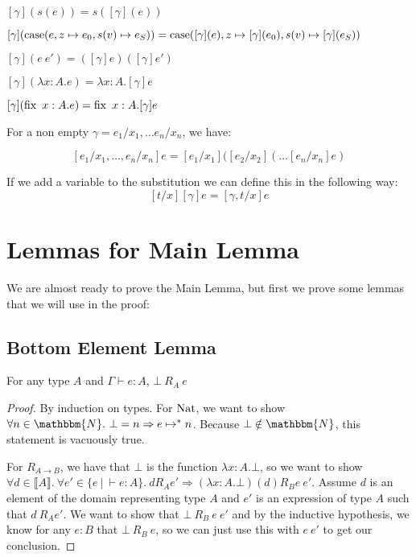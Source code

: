 \vspace{0.5cm}

\begin{adjustwidth}{2cm}{}

$[\gamma](s(e)) = s([\gamma] (e))$

$[\gamma](\operatorname{case} (e, z \mapsto e_0, s(v) \mapsto e_S)) = \operatorname{case} ([\gamma](e), z \mapsto [\gamma](e_0), s(v) \mapsto [\gamma](e_S))$

$[\gamma](e \ e') = ([\gamma] e) ([\gamma] e')$

$[\gamma] (\lambda x:A. e) = \lambda x:A. [\gamma] e$

$[\gamma] (\operatorname{fix} \ x:A. e) = \operatorname{fix} \ x:A. [\gamma] e$
\end{adjustwidth}

\vspace{0.5cm}

For a non empty $\gamma = e_1/x_1, \dots e_n/x_n$, we have:

\[ [e_1/x_1, \dots , e_n/x_n] e = [e_1/x_1]([e_2/x_2]( \dots [e_n/x_n] e) \]

If we add a variable to the substitution we can define this in the following way:
\[ [t/x][\gamma] e = [\gamma, t/x] e \]

\section{Lemmas for Main Lemma}
We are almost ready to prove the Main Lemma, but first we prove some lemmas that we will use in the proof:


\subsection{Bottom Element Lemma}

\vspace{0.25cm}

\begin{lem} \label{bot}
For any type $A$ and $\Gamma \vdash e: A$, $\bot \ R_A \ e$ 
\end{lem}

\begin{proof}
By induction on types. For $\operatorname{Nat}$, we want to show $\forall n \in \mathbbm{N}. \ \bot  = n \Rightarrow e \mapsto^* n$. Because $\bot \notin \mathbbm{N}$, this statement is vacuously true.

For $R_{A \to B}$, we have that $\bot$ is the function $\lambda x : A. \bot$, so we want to show $\forall  d \in \llbracket A \rrbracket. \ \forall e' \in \{ e \ | \ \vdash e : A\}. \ d R_A e' \Rightarrow (\lambda x : A. \bot)(d) R_B  e \ e'$. Assume $d$ is an element of the domain representing type $A$ and $e'$ is an expression of type $A$ such that $d \ R_A e'$. We want to show that $\bot \ R_B \ e \ e'$ and by the inductive hypothesis, we know for any $e : B$ that $\bot \ R_B \ e$, so we can just use this with $e \ e'$ to get our conclusion.
\end{proof}

